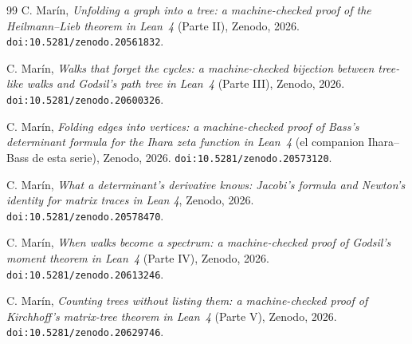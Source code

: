 \documentclass[11pt]{article}
\begin{document}
\begin{thebibliography}{99}
 C. Mar\'in,
\emph{Unfolding a graph into a tree: a machine-checked proof of the Heilmann--Lieb theorem
in Lean~4} (Parte II), Zenodo, 2026. \texttt{doi:10.5281/zenodo.20561832}.

 C. Mar\'in,
\emph{Walks that forget the cycles: a machine-checked bijection between tree-like walks and
Godsil's path tree in Lean~4} (Parte III), Zenodo, 2026. \texttt{doi:10.5281/zenodo.20600326}.

 C. Mar\'in,
\emph{Folding edges into vertices: a machine-checked proof of Bass's determinant formula
for the Ihara zeta function in Lean~4} (el companion Ihara--Bass de esta serie), Zenodo,
2026. \texttt{doi:10.5281/zenodo.20573120}.

 C. Mar\'in,
\emph{What a determinant's derivative knows: Jacobi's formula and Newton's identity for
matrix traces in Lean 4}, Zenodo, 2026. \texttt{doi:10.5281/zenodo.20578470}.

 C. Mar\'in,
\emph{When walks become a spectrum: a machine-checked proof of Godsil's moment theorem in
Lean~4} (Parte IV), Zenodo, 2026. \texttt{doi:10.5281/zenodo.20613246}.

 C. Mar\'in,
\emph{Counting trees without listing them: a machine-checked proof of Kirchhoff's
matrix-tree theorem in Lean~4} (Parte V), Zenodo, 2026. \texttt{doi:10.5281/zenodo.20629746}.

\end{thebibliography}
\end{document}
